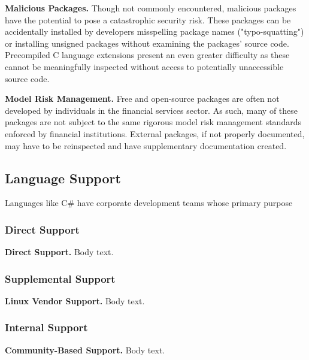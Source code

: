                 \textbf{Malicious Packages.}
                Though not commonly encountered, malicious packages have the potential to pose a catastrophic security risk. These packages can be accidentally installed by developers misspelling package names ("typo-squatting") or installing unsigned packages without examining the packages' source code. Precompiled C language extensions present an even greater difficulty as these cannot be meaningfully inspected without access to potentially unaccessible source code.

                \textbf{Model Risk Management.}
                Free and open-source packages are often not developed by individuals in the financial services sector. As such, many of these packages are not subject to the same rigorous model risk management standards enforced by financial institutions. External packages, if not properly documented, may have to be reinspected and have supplementary documentation created.

        \subsection{Language Support}

            Languages like C\# have corporate development teams whose primary purpose 

            \subsubsection{Direct Support}

                \textbf{Direct Support.}
                Body text.

            \subsubsection{Supplemental Support}

                \textbf{Linux Vendor Support.}
                Body text.

            \subsubsection{Internal Support}
                            
                \textbf{Community-Based Support.}
                Body text.

